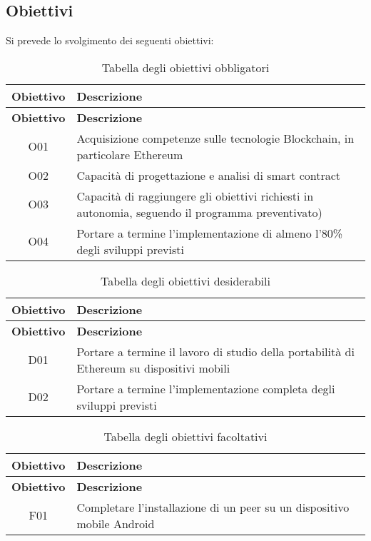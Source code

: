 \subsection{Obiettivi}
Si prevede lo svolgimento dei seguenti obiettivi:
\renewcommand{\arraystretch}{3}
\begin{center}
	\begin{longtable}{| c | p{30em} |}
		\caption{Tabella degli obiettivi obbligatori}
		\label{tab:obiettivi-obbligatori}\\
		\hline
		\textbf{Obiettivo} & \centering\textbf{Descrizione}\\
		\endfirsthead
		\hline
		\textbf{Obiettivo} & \centering\textbf{Descrizione}\\
		\endhead
		\endfoot
		
		\hline
		O01    & Acquisizione competenze sulle tecnologie Blockchain, in particolare Ethereum  \\
		\hline
		O02    & Capacità di progettazione e analisi di smart contract \\
		\hline
		O03    & Capacità di raggiungere gli obiettivi richiesti in autonomia, seguendo il programma preventivato) \\
		\hline
		O04    & Portare a termine l'implementazione di almeno l'80\% degli sviluppi previsti \\
		\hline
	\end{longtable}
\end{center}

\begin{center}
	\begin{longtable}{| c | p{30em} |}
		\caption{Tabella degli obiettivi desiderabili}
		\label{tab:obiettivi-desiderabili}\\
		\hline
		\textbf{Obiettivo} & \centering\textbf{Descrizione}\\
		\endfirsthead
		\hline
		\textbf{Obiettivo} & \centering\textbf{Descrizione}\\
		\endhead
		\endfoot
		
		\hline
		D01    & Portare a termine il lavoro di studio della portabilità di Ethereum su dispositivi mobili \\
		\hline
		D02    & Portare a termine l’implementazione completa degli sviluppi previsti \\
		\hline
	\end{longtable}
\end{center}
	
\begin{center}
	\begin{longtable}{| c | p{30em} |}
		\caption{Tabella degli obiettivi facoltativi}
		\label{tab:obiettivi-facoltativi}\\
		\hline
		\textbf{Obiettivo} & \centering\textbf{Descrizione}\\
		\endfirsthead
		\hline
		\textbf{Obiettivo} & \centering\textbf{Descrizione}\\
		\endhead
		\endfoot
		
		\hline
		F01    & Completare l'installazione di un peer su un dispositivo mobile Android \\
		\hline
	\end{longtable}
\end{center}


